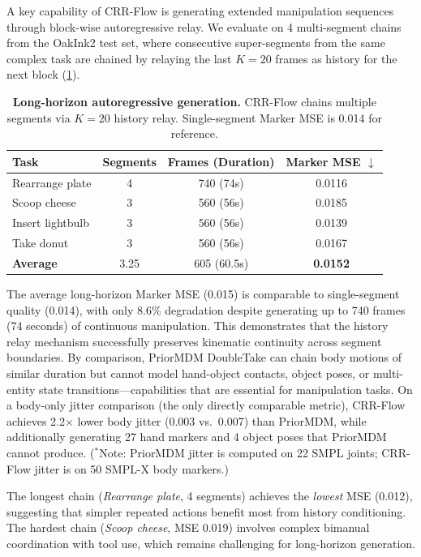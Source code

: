 A key capability of CRR-Flow is generating extended manipulation sequences through block-wise autoregressive relay.
We evaluate on 4 multi-segment chains from the OakInk2 test set, where consecutive super-segments from the same complex task are chained by relaying the last $K{=}20$ frames as history for the next block (\cref{tab:long_horizon}).

\begin{table}[t]
  \caption{\textbf{Long-horizon autoregressive generation.} CRR-Flow chains multiple segments via $K{=}20$ history relay. Single-segment Marker MSE is 0.014 for reference.}
  \label{tab:long_horizon}
  \centering
  \small
  \begin{tabular}{@{}lccc@{}}
    \toprule
    Task & Segments & Frames (Duration) & Marker MSE $\downarrow$ \\
    \midrule
    Rearrange plate & 4 & 740 (74s) & 0.0116 \\
    Scoop cheese  & 3 & 560 (56s) & 0.0185 \\
    Insert lightbulb & 3 & 560 (56s) & 0.0139 \\
    Take donut & 3 & 560 (56s) & 0.0167 \\
    \midrule
    \textbf{Average} & 3.25 & 605 (60.5s) & \textbf{0.0152} \\
    \bottomrule
  \end{tabular}
\end{table}

The average long-horizon Marker MSE (0.015) is comparable to single-segment quality (0.014), with only 8.6\% degradation despite generating up to 740 frames (74 seconds) of continuous manipulation.
This demonstrates that the history relay mechanism successfully preserves kinematic continuity across segment boundaries.
By comparison, PriorMDM DoubleTake can chain body motions of similar duration but cannot model hand-object contacts, object poses, or multi-entity state transitions---capabilities that are essential for manipulation tasks.
On a body-only jitter comparison (the only directly comparable metric), CRR-Flow achieves 2.2$\times$ lower body jitter (0.003 vs.\ 0.007) than PriorMDM, while additionally generating 27 hand markers and 4 object poses that PriorMDM cannot produce.
($^*$Note: PriorMDM jitter is computed on 22 SMPL joints; CRR-Flow jitter is on 50 SMPL-X body markers.)

The longest chain (\emph{Rearrange plate}, 4 segments) achieves the \emph{lowest} MSE (0.012), suggesting that simpler repeated actions benefit most from history conditioning.
The hardest chain (\emph{Scoop cheese}, MSE 0.019) involves complex bimanual coordination with tool use, which remains challenging for long-horizon generation.


